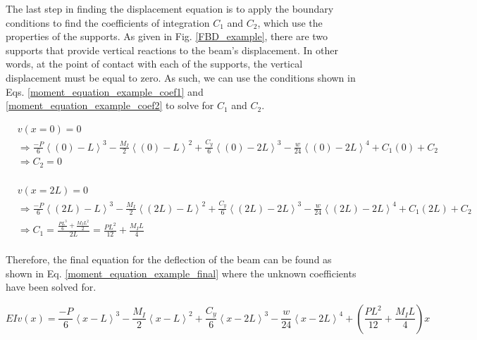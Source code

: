\documentclass[a4paper]{article}
\begin{document}
The last step in finding the displacement equation is to apply the boundary conditions to find the coefficients of integration $C_1$ and $C_2$, which use the properties of the supports. As given in Fig. \ref{FBD_example}, there are two supports that provide vertical reactions to the beam's displacement. In other words, at the point of contact with each of the supports, the vertical displacement must be equal to zero. As such, we can use the conditions shown in Eqs. \ref{moment_equation_example_coef1} and \ref{moment_equation_example_coef2} to solve for $C_1$ and $C_2$.

\begin{equation}
    \begin{split}
    	& v(x=0) = 0  \\
 	& \Rightarrow \frac{-P}{6}\left<(0)-L\right>^3 - \frac{M_I}{2}\left<(0)-L\right>^2 + \frac{C_y}{6}\left<(0)-2L\right>^3 - \frac{w}{24}\left<(0)-2L\right>^4 + C_1 (0) + C_2 \\
	& \Rightarrow C_2 = 0 \\
    \end{split}
\label{moment_equation_example_coef1}
\end{equation}

\begin{equation}
    \begin{split}
	& v(x=2L) = 0  \\
 	& \Rightarrow \frac{-P}{6}\left<(2L)-L\right>^3 - \frac{M_I}{2}\left<(2L)-L\right>^2 + \frac{C_y}{6}\left<(2L)-2L\right>^3 - \frac{w}{24}\left<(2L)-2L\right>^4 + C_1 (2L) + C_2 \\
	& \Rightarrow C_1 = \frac{\frac{PL^3}{6} + \frac{M_I L^2}{2}}{2L} = \frac{PL^2}{12} + \frac{M_I L}{4} \\
    \end{split}
\label{moment_equation_example_coef2}
\end{equation}

Therefore, the final equation for the deflection of the beam can be found as shown in Eq. \ref{moment_equation_example_final} where the unknown coefficients have been solved for.

\begin{equation}
EI v(x) = \frac{-P}{6}\left<x-L\right>^3 - \frac{M_I}{2}\left<x-L\right>^2 + \frac{C_y}{6}\left<x-2L\right>^3 - \frac{w}{24}\left<x-2L\right>^4 + \left( \frac{PL^2}{12} + \frac{M_I L}{4} \right) x
\label{moment_equation_example_final}
\end{equation}
\end{document}
